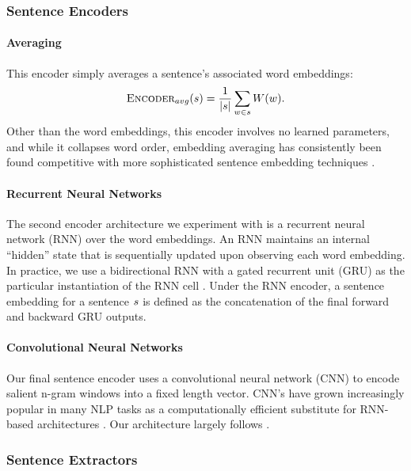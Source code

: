 
\subsubsection{Sentence Encoders}
\paragraph{Averaging} This encoder simply averages a sentence's
associated word embeddings:
\[ \textsc{Encoder}_{avg}(s) = \frac{1}{|s|} \sum_{w \in s} W(w). \]
Other than the word embeddings, this encoder involves no learned parameters,
and while it collapses word order, embedding averaging has consistently
been found competitive with more sophisticated sentence embedding techniques
\citep{iyyer2015deep,wieting2015towards,arora2016simple,wieting2017revisiting}.


\paragraph{Recurrent Neural Networks} The second encoder architecture
we experiment with is a recurrent neural network (RNN) over the word
embeddings. An RNN maintains an internal ``hidden'' state that is sequentially
updated upon observing each word embedding. In practice, we use a bidirectional
RNN with a gated recurrent unit (GRU) as the particular instantiation of 
the RNN cell \citep{cho2014learning}.
Under the RNN encoder, a sentence embedding for a sentence $s$ is defined 
as the concatenation of the final forward and backward GRU outputs.

\paragraph{Convolutional Neural Networks}
Our final sentence encoder uses a convolutional neural network
(CNN) to encode salient n-gram windows into a fixed length vector. 
CNN's have grown increasingly popular in many NLP tasks 
as a computationally efficient substitute for RNN-based architectures
\citep{kim2014convolutional,lei2015molding,dauphin2017language}.
Our architecture largely follows \cite{kim2014convolutional}.


\subsubsection{Sentence Extractors}

